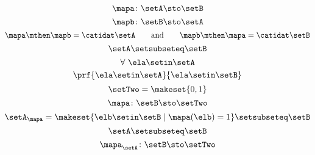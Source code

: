 {\begin{forslides}
        \begin{equation}
            \label{eq:slides_session2_183}
            \mapa\colon \setA \sto \setB
        \end{equation}
        \begin{equation}
            \label{eq:slides_session2_184}
            \mapb \colon \setB \sto \setA
        \end{equation}
        \begin{equation}
            \label{eq:slides_session2_185}
            \mapa \mthen \mapb = \catidat\setA \qquad \text{and}  \qquad \mapb \mthen \mapa = \catidat\setB
        \end{equation}
        \begin{equation}
            \label{eq:slides_session2_186}
            \setA \setsubseteq \setB
        \end{equation}
        \begin{equation}
            \label{eq:slides_session2_187}
            \forall \ \ela \setin\setA
        \end{equation}
        \begin{equation}
            \label{eq:slides_session2_188}
            \prf{
                \ela \setin\setA
            }{
                \ela \setin\setB
            }
        \end{equation}
        \begin{equation}
            \label{eq:slides_session2_189}
            \setTwo = \makeset{ 0, 1}
        \end{equation}
        \begin{equation}
            \label{eq:slides_session2_190}
            \mapa \colon \setB \sto \setTwo
        \end{equation}
        \begin{equation}
            \label{eq:slides_session2_191}
            \setA_\mapa = \makeset{ \elb \setin\setB \mid \mapa(\elb) = 1 } \setsubseteq \setB
        \end{equation}
        \begin{equation}
            \label{eq:slides_session2_192}
            \setA \setsubseteq \setB
        \end{equation}
        \begin{equation}
            \label{eq:slides_session2_193}
            \mapa_\setA \colon \setB \sto \setTwo
        \end{equation}
        \begin{equation}
            \label{eq:slides_session2_194}

\end{equation}
\end{forslides}}
